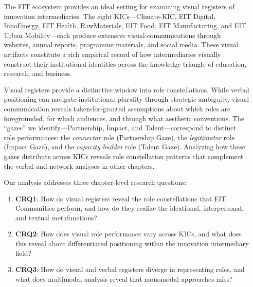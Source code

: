 \documentclass[../main.tex]{subfiles}
\begin{document}
The EIT ecosystem provides an ideal setting for examining visual registers of innovation intermediaries. The eight KICs---Climate-KIC, EIT Digital, InnoEnergy, EIT Health, RawMaterials, EIT Food, EIT Manufacturing, and EIT Urban Mobility---each produce extensive visual communications through websites, annual reports, programme materials, and social media. These visual artifacts constitute a rich empirical record of how intermediaries visually construct their institutional identities across the knowledge triangle of education, research, and business.

Visual registers provide a distinctive window into role constellations. While verbal positioning can navigate institutional plurality through strategic ambiguity, visual communication reveals taken-for-granted assumptions about which roles are foregrounded, for which audiences, and through what aesthetic conventions. The ``gazes'' we identify---Partnership, Impact, and Talent---correspond to distinct role performances: the \textit{connector} role (Partnership Gaze), the \textit{legitimator} role (Impact Gaze), and the \textit{capacity builder} role (Talent Gaze). Analyzing how these gazes distribute across KICs reveals role constellation patterns that complement the verbal and network analyses in other chapters.

Our analysis addresses three chapter-level research questions:

\begin{enumerate}
    \item \textbf{CRQ1}: How do visual registers reveal the role constellations that EIT Communities perform, and how do they realize the ideational, interpersonal, and textual metafunctions?
    \item \textbf{CRQ2}: How does visual role performance vary across KICs, and what does this reveal about differentiated positioning within the innovation intermediary field?
    \item \textbf{CRQ3}: How do visual and verbal registers diverge in representing roles, and what does multimodal analysis reveal that monomodal approaches miss?
\end{enumerate}
\end{document}

